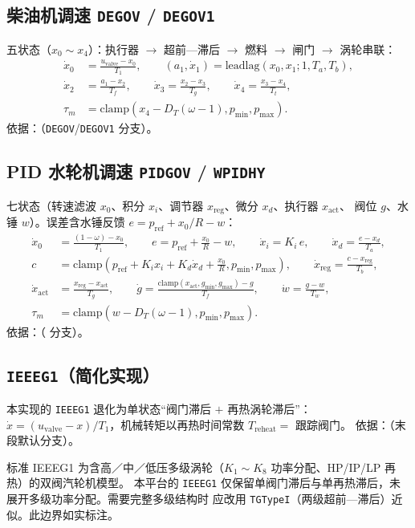 \subsection{柴油机调速 \texttt{DEGOV} / \texttt{DEGOV1}}
五状态（$x_0\!\sim\!x_4$）：执行器 $\to$ 超前—滞后 $\to$ 燃料 $\to$ 闸门 $\to$ 涡轮串联：
\begin{align}
 \dot x_0&=\frac{u_{\mathrm{valve}}-x_0}{T_1},\qquad
 (a_1,\dot x_1)=\mathrm{leadlag}(x_0,x_1;1,T_a,T_b),\\
 \dot x_2&=\frac{a_1-x_2}{T_f},\qquad \dot x_3=\frac{x_2-x_3}{T_g},\qquad \dot x_4=\frac{x_3-x_4}{T_t},\\
 \tau_m&=\mathrm{clamp}(x_4-D_T(\omega-1),p_{\min},p_{\max}).
\end{align}
依据：（\texttt{DEGOV}/\texttt{DEGOV1} 分支）。

\subsection{PID 水轮机调速 \texttt{PIDGOV} / \texttt{WPIDHY}}
七状态（转速滤波 $x_0$、积分 $x_i$、调节器 $x_{\mathrm{reg}}$、微分 $x_d$、执行器 $x_{\mathrm{act}}$、
阀位 $g$、水锤 $w$）。误差含水锤反馈 $e=p_{\mathrm{ref}}+x_0/R-w$：
\begin{align}
 \dot x_0&=\frac{(1-\omega)-x_0}{T_1},\qquad e=p_{\mathrm{ref}}+\frac{x_0}{R}-w,\qquad
 \dot x_i=K_i\,e,\qquad \dot x_d=\frac{e-x_d}{T_a},\\
 c&=\mathrm{clamp}\!\left(p_{\mathrm{ref}}+K_i x_i+K_d\dot x_d+\frac{x_0}{R},p_{\min},p_{\max}\right),\qquad
 \dot x_{\mathrm{reg}}=\frac{c-x_{\mathrm{reg}}}{T_b},\\
 \dot x_{\mathrm{act}}&=\frac{x_{\mathrm{reg}}-x_{\mathrm{act}}}{T_g},\qquad
 \dot g=\frac{\mathrm{clamp}(x_{\mathrm{act}},g_{\min},g_{\max})-g}{T_f},\qquad
 \dot w=\frac{g-w}{T_w},\\
 \tau_m&=\mathrm{clamp}(w-D_T(\omega-1),p_{\min},p_{\max}).
\end{align}
依据：（ 分支）。

\subsection{\texttt{IEEEG1}（简化实现）}
本实现的 \texttt{IEEEG1} 退化为单状态“阀门滞后 $+$ 再热涡轮滞后”：
$\dot x=(u_{\mathrm{valve}}-x)/T_1$，机械转矩以再热时间常数 $T_{\mathrm{reheat}}=$ 跟踪阀门。
依据：（末段默认分支）。
\begin{gapnote}
标准 IEEEG1 为含高／中／低压多级涡轮（$K_1\!\sim\!K_8$ 功率分配、HP/IP/LP 再热）的双阀汽轮机模型。
本平台的 \texttt{IEEEG1} 仅保留单阀门滞后与单再热滞后，未展开多级功率分配。需要完整多级结构时
应改用 \texttt{TGTypeI}（两级超前—滞后）近似。此边界如实标注。
\end{gapnote}

